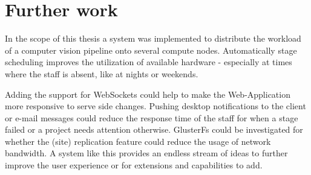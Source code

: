 \chapter{Further work}

In the scope of this thesis a system was implemented to distribute the workload of a computer vision pipeline onto several compute nodes.
Automatically stage scheduling improves the utilization of available hardware - especially at times where the staff is absent, like at nights or weekends.

Adding the support for WebSockets could help to make the Web-Application more responsive to serve side changes.
Pushing desktop notifications to the client or e-mail messages could reduce the response time of the staff for when a stage failed or a project needs attention otherwise.
GlusterFs could be investigated for whether the (site) replication feature could reduce the usage of network bandwidth.
A system like this provides an endless stream of ideas to further improve the user experience or for extensions and capabilities to add.